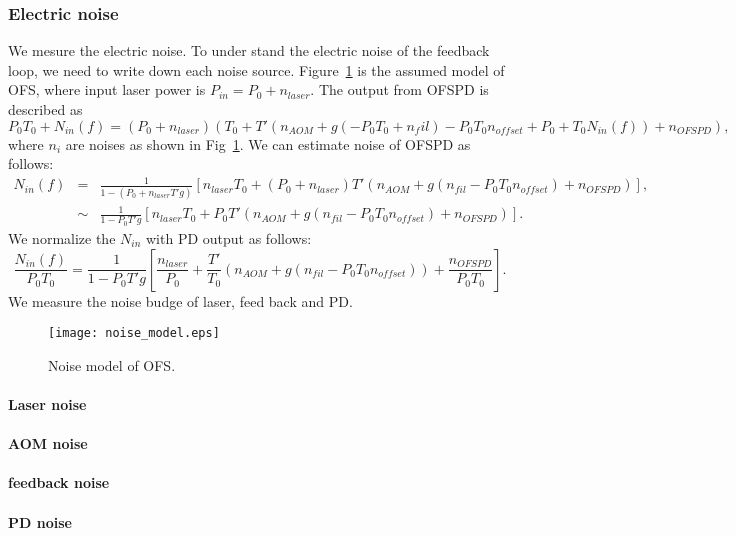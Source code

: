 \subsubsection{Electric noise}
We mesure the electric noise. To under stand the electric noise of the feedback loop, we need to write down each noise source.
Figure~\ref{fig:noise} is the assumed model of OFS, where input laser power is $P_{in}=P_0 + n_{laser}$.
The output from OFSPD is described as
\begin{equation}
P_0 T_0 +N_{in}(f) = (P_0 +n_{laser})(T_0+T'(n_{AOM}+g(-P_0 T_0+n_fil)-P_0 T_0 n_{offset} +P_0 +T_0 N_{in}(f))+n_{OFSPD}),
\end{equation}
where $n_{i}$ are noises as shown in Fig~\ref{fig:noise}. We can estimate noise of OFSPD as follows:
\begin{eqnarray}
N_{in}(f)&=&\frac{1}{1-(P_0+n_{laser}T'g)}[n_{laser}T_0 + (P_0+n_{laser})T'(n_{AOM}+g(n_{fil}-P_0T_0n_{offset})+n_{OFSPD})], \nonumber \\
&\sim&\frac{1}{1-P_0T'g}[n_{laser}T_0 + P_0T'(n_{AOM}+g(n_{fil}-P_0T_0n_{offset})+n_{OFSPD})].
\end{eqnarray}
We normalize the $N_{in}$ with PD output as follows:
\begin{equation}
\frac{N_{in}(f)}{P_0T_0}=\frac{1}{1-P_0T'g}[\frac{n_{laser}}{P_0} + \frac{T'}{T_0}(n_{AOM}+g(n_{fil}-P_0T_0n_{offset}))+\frac{n_{OFSPD}}{P_0T_0}].
\end{equation}
 We measure the noise budge of laser, feed back and PD.
\begin{figure}
\begin{center}
\texttt{[image: noise\_model.eps]}
\caption{Noise model of OFS.} 
\label{fig:noise} 
\end{center}
\end{figure}

\paragraph{Laser noise}
\paragraph{AOM noise}
\paragraph{feedback noise}
\paragraph{PD noise}


